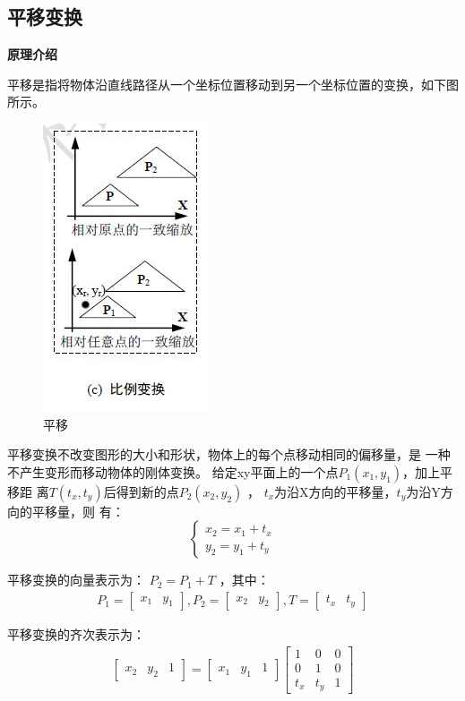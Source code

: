\documentclass[a4paper,UTF8]{article}
\theoremstyle{definition}
\begin{document}
\subsection{平移变换}
\textbf{原理介绍}\par
平移是指将物体沿直线路径从一个坐标位置移动到另一个坐标位置的变换，如下图所示。
\begin{figure}[h]

    \centering
    \includegraphics[width = .2\textwidth]{zoom.JPG}
    \caption{平移}
    \label{fig:label6}
\end{figure}
平移变换不改变图形的大小和形状，物体上的每个点移动相同的偏移量，是
一种不产生变形而移动物体的刚体变换。
给定xy平面上的一个点$P_1(x_1,y_1)$，加上平移距
离$T(t_x,t_y)$后得到新的点$P_2(x_2,y_2)$ ，
$t_x$为沿X方向的平移量，$t_y$为沿Y方向的平移量，则
有：
\begin{equation}
    \left\{
                 \begin{array}{lr}
                 x_2 = x_1 + t_x\\
                 y_2 = y_1 + t_y 
                 \end{array}
    \right.
\end{equation}

平移变换的向量表示为：
$P_2 = P_1 + T$ ，其中：
\begin{align}
P_1 =  \begin{bmatrix} x_1&y_1  \end{bmatrix}, P_2 =  \begin{bmatrix} x_2& y_2  \end{bmatrix},
T =  \begin{bmatrix} t_x&t_y  \end{bmatrix}
\end{align}

平移变换的齐次表示为：
\begin{align}
    \begin{bmatrix} x_2 & y_2& 1  \end{bmatrix} = \begin{bmatrix} x_1& y_1& 1  \end{bmatrix}
    \begin{bmatrix} 
        1 & 0 & 0 \\
        0 & 1 & 0 \\ 
        t_x & t_y & 1 
    \end{bmatrix}
\end{align}
\end{document}
